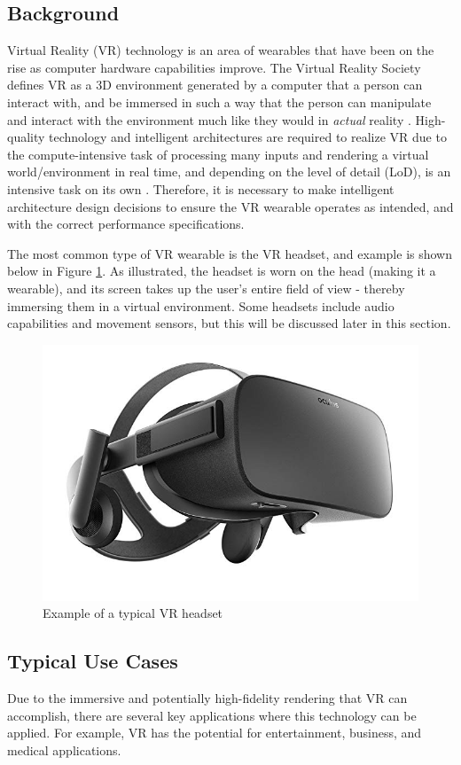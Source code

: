 \subsection{Background}
Virtual Reality (VR) technology is an area of wearables that have been on the rise
as computer hardware capabilities improve. The Virtual Reality Society defines VR as
a 3D environment generated by a computer that a person can interact with, and be
immersed in such a way that the person can manipulate and interact with the environment
much like they would in \textit{actual} reality \cite{vr_soc_defn}. High-quality
technology and intelligent architectures are required to realize VR due to
the compute-intensive task of processing many inputs and rendering a virtual
world/environment in real time, and depending on the level of detail (LoD), is
an intensive task on its own \cite{hickey_wt4_pres}. Therefore, it is necessary
to make intelligent architecture design decisions to ensure the VR wearable operates
as intended, and with the correct performance specifications.

The most common type of VR wearable is the VR headset, and example is shown below in
Figure \ref{vr:example}. As illustrated, the headset is worn on the head (making it
a wearable), and its screen takes up the user's entire field of view - thereby immersing
them in a virtual environment. Some headsets include audio capabilities and movement
sensors, but this will be discussed later in this section.


\begin{figure}[h]
    \centering
    \includegraphics[width=.3\linewidth]{media/vr_headset_example.jpg}
    \caption{Example of a typical VR headset \cite{vr_headset_pic}}
    \label{vr:example}
\end{figure}

\subsection{Typical Use Cases}
Due to the immersive and potentially high-fidelity rendering that VR can accomplish,
there are several key applications where this technology can be applied. For example, 
VR has the potential for entertainment, business, and medical applications.

